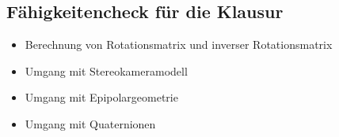 \subsection{Fähigkeitencheck für die Klausur}
\begin{itemize}
	\item Berechnung von Rotationsmatrix und inverser Rotationsmatrix %
	\item Umgang mit Stereokameramodell %
	\item Umgang mit Epipolargeometrie %
	\item Umgang mit Quaternionen %
\end{itemize}
































